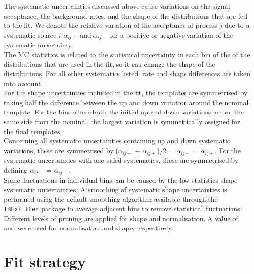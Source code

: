 The systematic uncertainties discussed above cause variations on the signal
acceptance, the background rates, and the shape of the distributions
that are fed to the fit.
We denote the relative variation of the acceptance of process $j$
due to a systematic source $i$ $\alpha_{ij+}$ and $\alpha_{ij-}$ for a
positive or negative variation of the systematic uncertainty.		\\
The MC statistics is related to the statistical uncertainty in each
bin of the of the distributions that are used in the fit,
so it can change the shape of the distributions. 
For all other systematics listed, rate and shape differences are taken
into account. \\
For the shape uncertainties included in the fit, the templates are symmetrised by
taking half the difference between the up and down variation around
the nominal template. For the bins where both the initial up and down
variations are on the same side from the nominal, the largest
variation is symmetrically assigned for the final templates.\\
Concerning all systematic uncertainties containing up and down
systematic variations, these are symmetrised by 
($\alpha_{ij-}$ + $\alpha_{ij+}$)/2 = $\alpha_{ij-}$ = $\alpha_{ij+}$. 
For the systematic uncertainties with one sided systematics, these
are symmetrised by defining $\alpha_{ij-}$ = $\alpha_{ij+}$.\\
Some fluctuations in individual bins can be caused
by the low statistics shape systematic uncertainties. A smoothing of
systematic shape uncertainties is performed using the default
smoothing algorithm available through the \texttt{TRExFitter} package
to average adjacent bins to remove statistical fluctuations. \\
Different levels of pruning are applied for shape
and normalisation. A value of \prunenorm and \pruneshape were used for
normalisation and shape, respectively. 


\section {Fit strategy}
\label{sec:stat:strategy}

